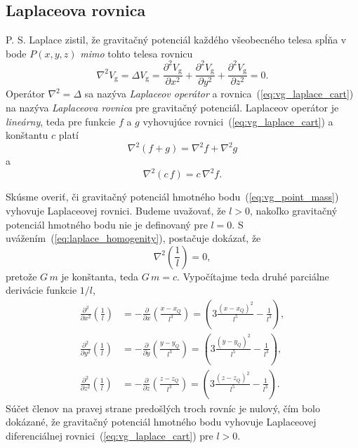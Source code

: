 \documentclass[a4paper, 12pt]{book}
\newcommand{\gidx}{\mathrm g}
\begin{document}
\subsection{Laplaceova rovnica}
\label{sec:laplace_equation}

P. S. Laplace zistil, že gravitačný potenciál každého všeobecného telesa spĺňa 
v bode $P(x, y, z)$ \emph{mimo} tohto telesa rovnicu
%
\begin{equation}
\label{eq:vg_laplace_cart}
\nabla^2 V_\gidx = \Delta V_\gidx = \frac{\partial^2 V_\gidx}{\partial x^2}
+ \frac{\partial^2 V_\gidx}{\partial y^2} + \frac{\partial^2 V_\gidx}{\partial 
z^2} = 0{.}
\end{equation}
%
Operátor $\nabla^2 = \Delta$ sa nazýva \emph{Laplaceov operátor} 
a rovnica~(\ref{eq:vg_laplace_cart}) na nazýva \emph{Laplaceova rovnica} pre 
gravitačný potenciál.  Laplaceov operátor je \emph{lineárny}, teda pre funkcie 
$f$ a $g$ vyhovujúce rovnici~(\ref{eq:vg_laplace_cart}) a konštantu $c$ platí
%
\begin{equation}
\label{eq:laplace_additivity}
\nabla^2 \left(f + g \right) = \nabla^2 f + \nabla^2 g
\end{equation}
%
a
%
\begin{equation}
\label{eq:laplace_homogenity}
\nabla^2 (c \, f) = c \, \nabla^2 f{.}
\end{equation}

Skúsme overiť, či gravitačný potenciál hmotného bodu~(\ref{eq:vg_point_mass}) 
vyhovuje Laplaceovej rovnici.  Budeme uvažovať, že $l > 0$, nakoľko gravitačný 
potenciál hmotného bodu nie je definovaný pre $l = 0$.  
S uvážením~(\ref{eq:laplace_homogenity}), postačuje dokázať, že
%
\begin{equation}
\nabla^2 \left( \frac{1}{l} \right) = 0{,}
\end{equation}
%
pretože $G \, m$ je konštanta, teda $G \, m = c$.  Vypočítajme teda druhé 
parciálne derivácie funkcie $1 \slash l$,
%
\begin{equation}
\label{eq:l_2nd_derivatives}
\begin{split}
\frac{\partial^2}{\partial x^2} \left( \frac{1}{l} \right) &= 
-\frac{\partial}{\partial x} \left( \frac{x - x_Q}{l^3} \right) = \left(3 
\frac{(x - x_Q)^2}{l^5} - \frac{1}{l^3} \right){,}\\
%
\frac{\partial^2}{\partial y^2} \left( \frac{1}{l} \right) &= 
-\frac{\partial}{\partial y} \left( \frac{y - y_Q}{l^3} \right) = \left(3 
\frac{(y - y_Q)^2}{l^5} - \frac{1}{l^3} \right){,}\\
%
\frac{\partial^2}{\partial z^2} \left( \frac{1}{l} \right) &= 
-\frac{\partial}{\partial z} \left( \frac{z - z_Q}{l^3} \right) = \left(3 
\frac{(z - z_Q)^2}{l^5} - \frac{1}{l^3} \right){.}
\end{split}
\end{equation}
%
Súčet členov na pravej strane predošlých troch rovníc je nulový, čím bolo 
dokázané, že gravitačný potenciál hmotného bodu vyhovuje Laplaceovej 
diferenciálnej rovnici~(\ref{eq:vg_laplace_cart}) pre $l > 0$.
\end{document}
